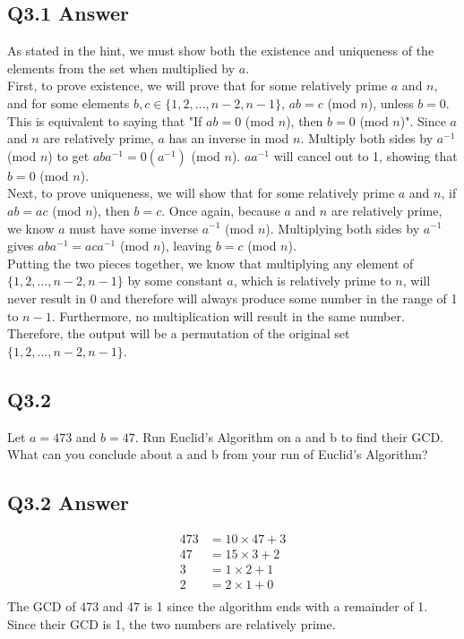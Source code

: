 \documentclass{article}
\begin{document}
\subsection*{Q3.1 Answer}
As stated in the hint, we must show both the existence and uniqueness of the elements from the set when multiplied by $a$.
\\ First, to prove existence, we will prove that for some relatively prime $a$ and $n$, and for some elements $b,c\in \{1,2,...,n-2,n-1\}$,  $ab=c$ (mod $n$), unless $b=0$. This is equivalent to saying that "If $ab=0$ (mod $n$), then $b=0$ (mod $n$)". Since $a$ and $n$ are relatively prime, $a$ has an inverse in mod $n$. Multiply both sides by $a^{-1}$ (mod $n$) to get $aba^{-1}=0(a^{-1})$ (mod $n$). $aa^{-1}$ will cancel out to 1, showing that $b=0$ (mod $n$).
\\ Next, to prove uniqueness, we will show that for some relatively prime $a$ and $n$, if $ab=ac$ (mod $n$), then $b=c$. Once again, because $a$ and $n$ are relatively prime, we know $a$ must have some inverse $a^{-1}$ (mod $n$). Multiplying both sides by $a^{-1}$ gives $aba^{-1}=aca^{-1}$ (mod $n$), leaving $b=c$ (mod $n$).
\\ Putting the two pieces together, we know that multiplying any element of $\{1,2,...,n-2,n-1\}$ by some constant $a$, which is relatively prime to $n$, will never result in 0 and therefore will always produce some number in the range of 1 to $n-1$. Furthermore, no multiplication will result in the same number. Therefore, the output will be a permutation of the original set $\{1,2,...,n-2,n-1\}$.
\newpage

\subsection*{Q3.2}
Let $a = 473$ and $b = 47$. Run Euclid's Algorithm on a and b to find their GCD. What can you conclude about a and b from your run of Euclid's Algorithm?
\newpage
\subsection*{Q3.2 Answer}
\begin{align*}
473 &= 10 \times 47 + 3 \\
47 &= 15 \times 3 + 2 \\
3 &= 1 \times 2 + 1 \\
2 &= 2 \times 1 + 0 \\
\end{align*}
The GCD of 473 and 47 is 1 since the algorithm ends with a remainder of 1. Since their GCD is 1, the two numbers are relatively prime.
\newpage
\end{document}
